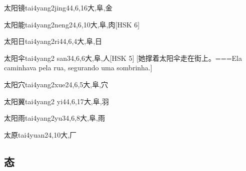 \begin{EntryWithPhonetic}{太阳镜}{tai4yang2jing4}{4,6,16}{⼤,⾩,⾦}
\end{EntryWithPhonetic}

\begin{EntryWithPhonetic}{太阳能}{tai4yang2neng2}{4,6,10}{⼤,⾩,⾁}[HSK 6]
\end{EntryWithPhonetic}

\begin{EntryWithPhonetic}{太阳日}{tai4yang2ri4}{4,6,4}{⼤,⾩,⽇}
\end{EntryWithPhonetic}

\begin{EntryWithPhonetic}{太阳伞}{tai4yang2 san3}{4,6,6}{⼤,⾩,⼈}[HSK 5]
  [她撑着太阳伞走在街上。===Ela caminhava pela rua, segurando uma sombrinha.]
\end{EntryWithPhonetic}

\begin{EntryWithPhonetic}{太阳穴}{tai4yang2xue2}{4,6,5}{⼤,⾩,⽳}
\end{EntryWithPhonetic}

\begin{EntryWithPhonetic}{太阳翼}{tai4yang2 yi4}{4,6,17}{⼤,⾩,⽻}
\end{EntryWithPhonetic}

\begin{EntryWithPhonetic}{太阳雨}{tai4yang2yu3}{4,6,8}{⼤,⾩,⾬}
\end{EntryWithPhonetic}

\begin{EntryWithPhonetic}{太原}{tai4yuan2}{4,10}{⼤,⼚}
\end{EntryWithPhonetic}

\subsection*{态}

